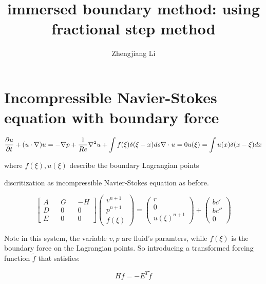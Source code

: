 \documentclass[11pt]{article}
\begin{document}
\title{immersed boundary method: using fractional step method}

\author{Zhengjiang Li}

\date{}

\maketitle

\section {Incompressible Navier-Stokes equation with boundary force}

	\begin{equation} 
	 \frac{\partial u}{\partial t} + ( u \cdot \nabla) u = - \nabla p + \frac{1}{Re} \nabla^2 u + \int f(\xi) \delta(\xi - x)ds
\\
	 \nabla \cdot u = 0 
\\
	u(\xi) = \int u(x) \delta(x - \xi) dx
	\end{equation}

where $f(\xi), u(\xi) $  describe the boundary Lagrangian points 

discritization as incompressible Navier-Stokes equation as before. 

$$ 
\begin{bmatrix} A && G && -H \\ D && 0 && 0  \\ E && 0 && 0 \end{bmatrix} \begin{pmatrix} v^{n+1} \\ p^{n+1} \\ f(\xi) \end{pmatrix} = \left( \begin{array}{c} r \\ 0 \\u(\xi)^{n+1}  \end{array} \right) + \left ( \begin{array}{c} bc' \\ bc'' \\ 0 \end{array} \right) $$

Note in this system, the variable $v, p$ are fluid's paramters, while $f(\xi)$ is the boundary force on the Lagrangian points. So introducing a transformed forcing function $\tilde{f}$ that satisfies:

	$$ Hf = -E^T \tilde{f} $$
\end{document}
